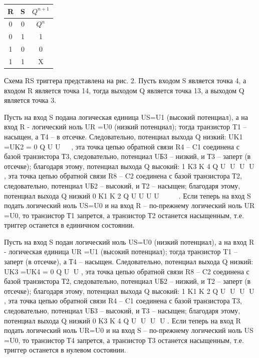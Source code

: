 \documentclass[a4paper,14pt]{article}
\begin{document}
\begin{table}[H]
	\begin{center}
	\begin{tabular}{|c|c|c|}
		\hline
		R & S & $Q^{n+1}$  \\ \hline
		0 & 0 & $Q^n$  \\ \hline
		0 & 1 & 1 \\ \hline
		1 & 0 & 0 \\ \hline
		1 & 1 & X \\ \hline
	\end{tabular}
	\end{center}
\end{table}

Схема RS триггера представлена на рис. 2. Пусть входом S является точка 4, а входом
R является точка 14, тогда выходом Q является точка 13, а выходом Q является точка 3.

Пусть на вход S подана логическая единица US=U1 (высокий потенциал), а на вход R -
логический ноль UR =U0 (низкий потенциал); тогда транзистор T1 – насыщен, а Т4 – в
отсечке. Следовательно, потенциал выхода Q низкий: UK1 =UK2 = 0
Q
U U   , эта точка цепью
обратной связи R4 – C1 соединена с базой транзистора Т3, следовательно, потенциал UБ3 –
низкий, и Т3 – заперт (в отсечке); благодаря этому, потенциал выхода Q высокий:
1
K3 K 4 Q U U U U , эта точка цепью обратной связи R8 – C2 соединена с базой транзистора
Т2, следовательно, потенциал UБ2 – высокий, и Т2 – насыщен; благодаря этому, потенциал
выхода Q низкий 0
K1 K 2
Q
U U U U     . Если теперь на вход S подать логический ноль US=U0
и на вход R – по-прежнему логический ноль UR =U0, то транзистор Т1 запрется, а транзистор
Т2 останется насыщенным, т.е. триггер останется в единичном состоянии.

Пусть на вход S подан логический ноль US=U0 (низкий потенциал), а на вход R -
логическая единица UR =U1 (высокий потенциал); тогда транзистор T1 – заперт (в отсечке), а
Т4 – насыщен. Следовательно, потенциал выхода Q низкий: UK3 =UK4 = 0
Q U U , эта точка
цепью обратной связи R8 – C2 соединена с базой транзистора Т2, следовательно, потенциал
UБ2 – низкий, и Т2 – заперт (в отсечке); благодаря этому, потенциал выхода Q высокий:
1
K1 K 2 Q U U U U , эта точка цепью обратной связи R4 – C1 соединена с базой транзистора
Т3, следовательно, потенциал UБ3 – высокий, и Т3 – насыщен; благодаря этому, потенциал
выхода Q низкий 0
K3 K 4 Q U U U U . Если теперь на вход R подать логический ноль
UR=U0 и на вход S – по-прежнему логический ноль US =U0, то транзистор Т4 запрется, а
транзистор Т3 останется насыщенным, т.е. триггер останется в нулевом состоянии.
\end{document}
